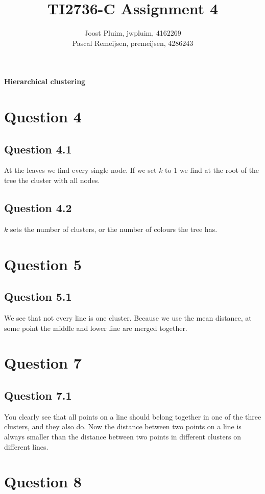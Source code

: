 \documentclass[11pt,twoside,a4paper]{article}
\title{TI2736-C Assignment 4}
\author{
	Joost Pluim, jwpluim, 4162269 \\
	Pascal Remeijsen, premeijsen, 4286243
}
\begin{document}
\maketitle
\clearpage

\textbf{Hierarchical clustering}

\section{Question 4}

	\subsection{Question 4.1}
	At the leaves we find every single node. If we set $k$ to 1 we find at the root of the tree the cluster with all nodes.
	
	\subsection{Question 4.2}
	$k$ sets the number of clusters, or the number of colours the tree has.
	
\section{Question 5}

	\subsection{Question 5.1}
	We see that not every line is one cluster. Because we use the mean distance, at some point the middle and lower line are merged together. 
	
\section{Question 7}

	\subsection{Question 7.1}
	You clearly see that all points on a line should belong together in one of the three clusters, and they also do. Now the distance between two points on a line is always smaller than the distance between two points in different clusters on different lines.
	
\section{Question 8}
\end{document}
